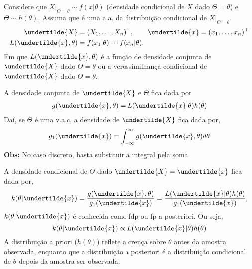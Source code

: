 \begin{frame}{}
\begin{block}{}
\justifying
Considere que $X|_{\Theta=\theta}\sim f(x|\theta)$ (densidade condicional de $X$ dado $\Theta=\theta$) e $\Theta\sim h(\theta).$ Assuma que \seqX é uma a.a. da distribuição condicional de $X|_{\Theta=\theta}.$
\begin{align*}
\undertilde{X}&=(X_{1},\ldots,X_{n})^{\top},\qquad \undertilde{x}=(x_{1},\ldots,x_{n})^{\top}\\
L(\undertilde{x},\theta)&=f(x_{1}|\theta)\cdots f(x_{n}|\theta).
\end{align*}
Em que $L(\undertilde{x},\theta)$ é a função de densidade conjunta de $\undertilde{X}$ dado $\Theta=\theta$ ou a verossimilhança condicional de $\undertilde{X}$ dado $\Theta=\theta.$
\end{block}
\end{frame}

\begin{frame}{}
\begin{block}{}
\justifying
A densidade conjunta de $\undertilde{X}$ e $\Theta$ fica dada por 
\begin{align*}
    g(\undertilde{x},\theta)=L(\undertilde{x}|\theta)h(\theta)
\end{align*}
Daí, se $\Theta$ é uma v.a.c, a densidade de $\undertilde{X}$ fica dada por,
\begin{align*}
    g_{1}(\undertilde{x})=\int_{-\infty}^{\infty}g(\undertilde{x},\theta)d\theta
\end{align*}
\textbf{Obs:} No caso discreto, basta substituir a integral pela soma.
\end{block}
\end{frame}

\begin{frame}{}
\begin{block}{}
\justifying
A densidade condicional de $\Theta$ dado $\undertilde{X}=\undertilde{x}$ fica dada por,
\begin{align*}
    k(\theta|\undertilde{x})=\dfrac{g(\undertilde{x},\theta)}{g_{1}(\undertilde{x})}=\dfrac{L(\undertilde{x}|\theta)h(\theta)}{g_{1}(\undertilde{x})},
\end{align*}
$k(\theta|\undertilde{x})$ é conhecida como fdp ou fp a posteriori. Ou seja, 
$$k(\theta|\undertilde{x})\propto L(\undertilde{x}|\theta)h(\theta)$$
A distribuição a priori ($h(\theta)$) reflete a crença sobre $\theta$ antes da amostra observada, enquanto que a distribuição a posteriori é a distribuição condicional de $\theta$ depois da amostra ser observada.
\end{block}
\end{frame}

